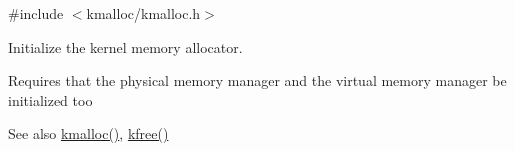 {\ttfamily \#include $<$kmalloc/kmalloc.\+h$>$}



Initialize the kernel memory allocator. 

Requires that the physical memory manager and the virtual memory manager be initialized too \begin{DoxySeeAlso}{See also}
\hyperlink{group__kmalloc_ga5f52d7c56b7d67dc2f96b2e93dfdc7be}{kmalloc()}, \hyperlink{group__kmalloc_gaa3ff6401026972fc396bda649a01c994}{kfree()} 
\end{DoxySeeAlso}
